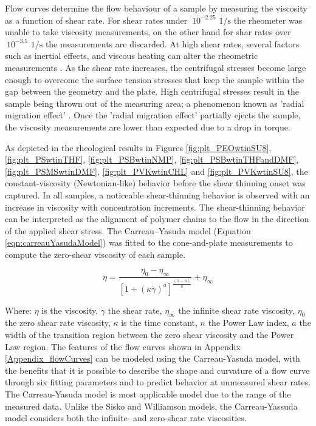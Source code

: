 Flow curves determine the flow behaviour of a sample by measuring the viscosity as a function of shear rate. For shear rates under $~10^{-2.25} \textrm{ 1} / \textrm{s}$ the rheometer was unable to take viscosity measurements, on the other hand for shar rates over $~10^{-3.5} \textrm{ 1} / \textrm{s}$ the measurements are discarded. At high shear rates, several factors such as inertial effects, and viscous heating can alter the rheometric measurements \cite{RByron1987, Macosko1994}. As the shear rate increases, the centrifugal stresses become large enough to overcome the surface tension stresses that keep the sample within the gap between the geometry and the plate. High centrifugal stresses result in the sample being thrown out of the measuring area; a phenomenon known as 'radial migration effect' \cite{Connelly1985}. Once the 'radial migration effect' partially ejects the sample, the viscosity measurements are lower than expected due to a drop in torque. \cite{Pipe2008}

As depicted in the rheological results in Figures \ref{fig:plt_PEOwtinSU8}, \ref{fig:plt_PSwtinTHF}, \ref{fig:plt_PSBwtinNMP}, \ref{fig:plt_PSBwtinTHFandDMF}, \ref{fig:plt_PSMSwtinDMF}, \ref{fig:plt_PVKwtinCHL} and \ref{fig:plt_PVKwtinSU8}, the constant-viscosity (Newtonian-like) behavior before the shear thinning onset was captured. In all samples, a noticeable shear-thinning behavior is observed with an increase in viscosity with concentration increments. The shear-thinning behavior can be interpreted as the alignment of polymer chains to the flow in the direction of the applied shear stress. \cite{Floreshernandez2020} The Carreau–Yasuda model (Equation \ref{eqn:carreauYasudaModel}) \cite{RByron1987} was fitted to the cone-and-plate  measurements to compute the zero-shear viscosity of each sample.

\begin{equation}\label{eqn:carreauYasudaModel}
    \eta = \frac{\eta_0 - \eta_{\infty}}{\left[1 + \left(\kappa \dot{\gamma}\right)^a\right]^{\frac{(1 - n)}{a}}} + \eta_{\infty}
\end{equation}

Where: $\eta$ is the viscosity, $\dot{\gamma}$ the shear rate, $\eta_{\infty}$ the  infinite shear rate viscosity, $\eta_0$ the zero shear rate viscosity, $\kappa$ is the time constant, $n$ the Power Law index, $a$ the width of the transition region between the zero shear viscosity and the Power Law region. The features of the flow curves shown in Appendix \ref{Appendix_flowCurves} can be modeled using the Carreau-Yasuda model, with the benefits that it is possible to describe the shape and curvature of a flow curve through six fitting parameters and to predict behavior at unmeasured shear rates. The Carreau-Yasuda model is most applicable model due to the range of the measured data. Unlike the Sisko and Williamson models, the Carreau-Yassuda model considers both the infinite- and zero-shear rate viscosities.

